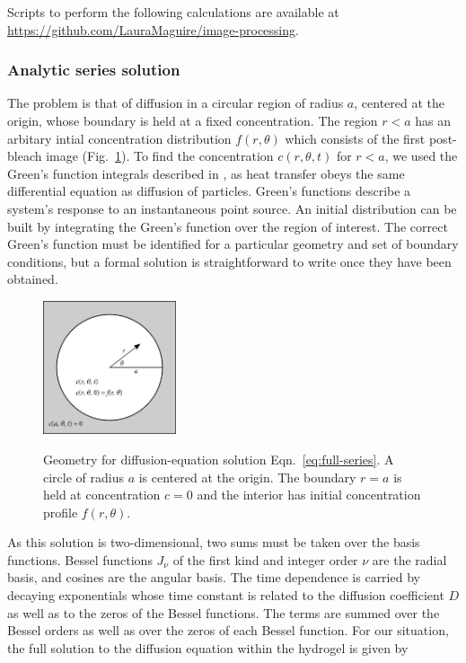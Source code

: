 Scripts to perform the following calculations are available at \url{https://github.com/LauraMaguire/image-processing}.

\subsubsection{Analytic series solution}

The problem is that of diffusion in a circular region of radius $a$, centered at the origin, whose boundary is held at a fixed concentration.  The region $r<a$ has an arbitary intial concentration distribution $f(r,\theta)$ which consists of the first post-bleach image (Fig.~\ref{fig:carslaw-geo}).  To find the concentration $c(r,\theta,t)$ for $r<a$, we used the Green's function integrals described in \cite{h.s.carslaw59}, as heat transfer obeys the same differential equation as diffusion of particles.  Green's functions describe a system's response to an instantaneous point source.  An initial distribution can be built by integrating the Green's function over the region of interest.  The correct Green's function must be identified for a particular geometry and set of boundary conditions, but a formal solution is straightforward to write once they have been obtained.

\begin{figure}
\caption{Geometry for diffusion-equation solution Eqn.~\ref{eq:full-series}.  A circle of radius $a$ is centered at the origin.  The boundary $r=a$ is held at concentration $c=0$ and the interior has initial concentration profile $f(r,\theta)$.}
\centering
\includegraphics[width=0.35\textwidth]{figs/ch04/carslaw-geometry}
\label{fig:carslaw-geo}
\end{figure} 

As this solution is two-dimensional, two sums must be taken over the basis functions.  Bessel functions $J_\nu$ of the first kind and integer order $\nu$ are the radial basis, and cosines are the angular basis.  The time dependence is carried by decaying exponentials whose time constant is related to the diffusion coefficient $D$ as well as to the zeros of the Bessel functions.  The terms are summed over the Bessel orders as well as over the zeros of each Bessel function.  For our situation, the full solution to the diffusion equation within the hydrogel is given by \cite{h.s.carlslaw59}

